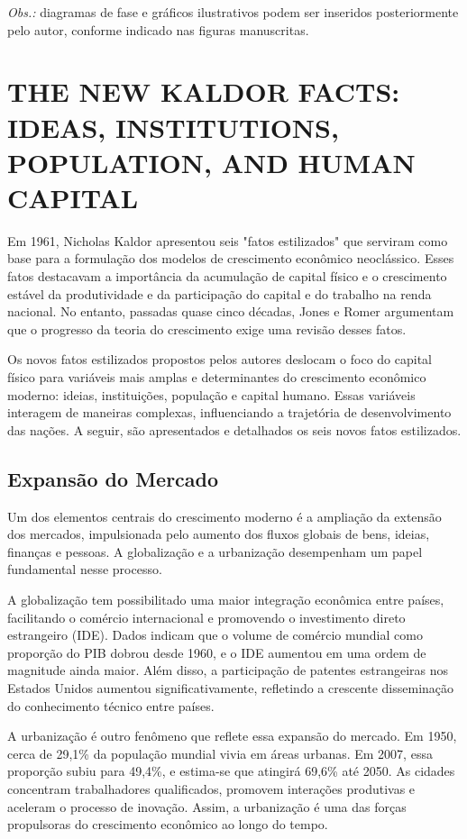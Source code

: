 \documentclass[a4paper,12pt]{article}[abntex2]
\begin{document}
\medskip
\noindent\textit{Obs.:} diagramas de fase e gráficos ilustrativos podem ser inseridos posteriormente pelo autor, conforme indicado nas figuras manuscritas.



\newpage
\section{\textbf{THE NEW KALDOR FACTS: IDEAS, INSTITUTIONS, POPULATION, AND HUMAN CAPITAL}}

Em 1961, Nicholas Kaldor apresentou seis "fatos estilizados" que serviram como base para a formulação dos modelos de crescimento econômico neoclássico. Esses fatos destacavam a importância da acumulação de capital físico e o crescimento estável da produtividade e da participação do capital e do trabalho na renda nacional. No entanto, passadas quase cinco décadas, Jones e Romer argumentam que o progresso da teoria do crescimento exige uma revisão desses fatos. 

Os novos fatos estilizados propostos pelos autores deslocam o foco do capital físico para variáveis mais amplas e determinantes do crescimento econômico moderno: ideias, instituições, população e capital humano. Essas variáveis interagem de maneiras complexas, influenciando a trajetória de desenvolvimento das nações. A seguir, são apresentados e detalhados os seis novos fatos estilizados.

\subsection{Expansão do Mercado}
Um dos elementos centrais do crescimento moderno é a ampliação da extensão dos mercados, impulsionada pelo aumento dos fluxos globais de bens, ideias, finanças e pessoas. A globalização e a urbanização desempenham um papel fundamental nesse processo.

A globalização tem possibilitado uma maior integração econômica entre países, facilitando o comércio internacional e promovendo o investimento direto estrangeiro (IDE). Dados indicam que o volume de comércio mundial como proporção do PIB dobrou desde 1960, e o IDE aumentou em uma ordem de magnitude ainda maior. Além disso, a participação de patentes estrangeiras nos Estados Unidos aumentou significativamente, refletindo a crescente disseminação do conhecimento técnico entre países.

A urbanização é outro fenômeno que reflete essa expansão do mercado. Em 1950, cerca de 29,1\% da população mundial vivia em áreas urbanas. Em 2007, essa proporção subiu para 49,4\%, e estima-se que atingirá 69,6\% até 2050. As cidades concentram trabalhadores qualificados, promovem interações produtivas e aceleram o processo de inovação. Assim, a urbanização é uma das forças propulsoras do crescimento econômico ao longo do tempo.
\end{document}
